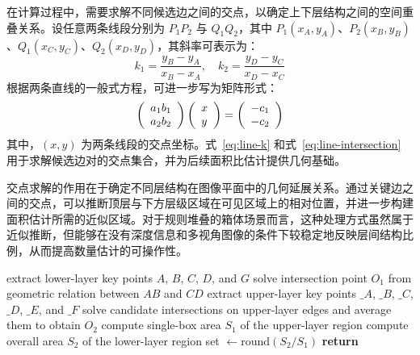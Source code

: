 在计算过程中，需要求解不同候选边之间的交点，以确定上下层结构之间的空间重叠关系。设任意两条线段分别为 $P_1P_2$ 与 $Q_1Q_2$，其中 $P_1(x_A,y_A)$、$P_2(x_B,y_B)$、$Q_1(x_C,y_C)$、$Q_2(x_D,y_D)$，其斜率可表示为：
\begin{equation}\label{eq:line-k}
{k_1} = \frac{{{y_B} - {y_A}}}{{{x_B} - {x_A}}}, \quad
{k_2} = \frac{{{y_D} - {y_C}}}{{{x_D} - {x_C}}}
\end{equation}
根据两条直线的一般式方程，可进一步写为矩阵形式：
\begin{equation}\label{eq:line-intersection}
\left( \begin{array}{l}
{a_1}{\rm{  }}{b_1}\\
{a_2}{\rm{  }}{b_2}
\end{array} \right)\left( \begin{array}{l}
x\\
y
\end{array} \right) = \left( \begin{array}{l}
 - {c_1}\\
 - {c_2}
\end{array} \right)
\end{equation}
其中，$(x,y)$ 为两条线段的交点坐标。式~\ref{eq:line-k} 和式~\ref{eq:line-intersection} 用于求解候选边对的交点集合，并为后续面积比估计提供几何基础。

交点求解的作用在于确定不同层结构在图像平面中的几何延展关系。通过关键边之间的交点，可以推断顶层与下方层级区域在可见区域上的相对位置，并进一步构建面积估计所需的近似区域。对于规则堆叠的箱体场景而言，这种处理方式虽然属于近似推断，但能够在没有深度信息和多视角图像的条件下较稳定地反映层间结构比例，从而提高数量估计的可操作性。

\begin{algorithm}[H]
  \caption{MaskKeypointDrivenAreaRatioEstimation}
  \label{alg:area_ratio}
  \footnotesize
  extract lower-layer key points $A$, $B$, $C$, $D$, and $G$
  solve intersection point $O_1$ from geometric relation between $AB$ and $CD$
  extract upper-layer key points $\_A$, $\_B$, $\_C$, $\_D$, $\_E$, and $\_F$
  solve candidate intersections on upper-layer edges and average them to obtain $O_2$
  compute single-box area $S_1$ of the upper-layer region
  compute overall area $S_2$ of the lower-layer region
  set  $\leftarrow \mathrm{round}(S_2/S_1)$
  \textbf{return} 
\end{algorithm}

